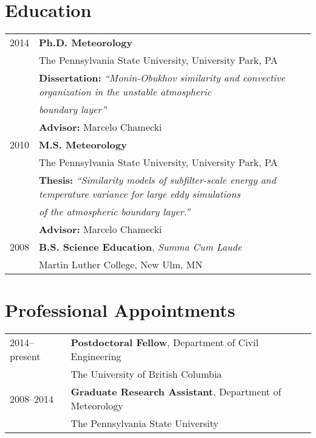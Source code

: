 \documentclass[11pt,letterpaper]{article}
\begin{document}
\section*{Education}
\begin{tabular}{l l}
2014 & \textbf{Ph.D. Meteorology} \\
      & The Pennsylvania State University, University Park, PA \\
      & {\small \textbf{Dissertation:}} \textit{\small``Monin-Obukhov similarity and convective organization in the unstable atmospheric}\\
      & \textit{\small boundary layer''} \\%
      & {\small \textbf{Advisor:}} {\small Marcelo Chamecki} \\[1.5\parskip]

2010 & \textbf{M.S. Meteorology} \\
      & The Pennsylvania State University, University Park, PA \\
      & {\small \textbf{Thesis:}} \textit{\small ``Similarity models of subfilter-scale energy and temperature variance for large eddy simulations} \\
      & \textit{\small of the atmospheric boundary layer.''} \\%
      & {\small \textbf{Advisor:}} {\small Marcelo Chamecki} \\[1.5\parskip]

2008 & \textbf{B.S. Science Education}, \textit{Summa Cum Laude} \\
              & Martin Luther College, New Ulm, MN
\end{tabular}

\section*{Professional Appointments} 

\begin{tabular}{l l}
2014--present & \textbf{Postdoctoral Fellow}, Department of Civil Engineering \\
              & The University of British Columbia \\[1.5\parskip]
2008--2014 & \textbf{Graduate Research Assistant}, Department of Meteorology \\
                 & The Pennsylvania State University
\end{tabular}
\end{document}
